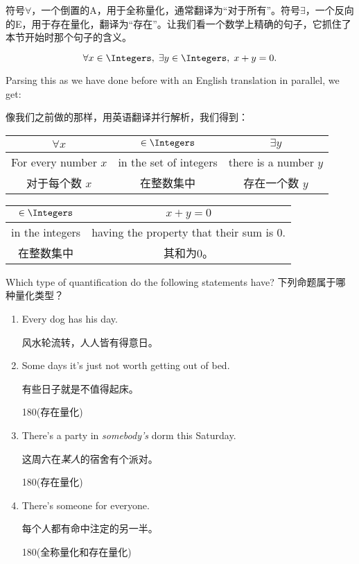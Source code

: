 符号$\forall$，一个倒置的A，用于全称量化，通常翻译为“对于所有”。符号$\exists$，一个反向的E，用于存在量化，翻译为“存在”。让我们看一个数学上精确的句子，它抓住了本节开始时那个句子的含义。

\[ \forall x \in \Integers, \; \exists y \in \Integers, \; x+y=0.
\]

Parsing this as we have done before with an English translation in 
parallel, we get:

像我们之前做的那样，用英语翻译并行解析，我们得到：

\vspace{.2in}

\begin{tabular}{c|c|c}
\rule[-10pt]{0pt}{22pt} $\forall x$ & $\in \Integers$ & $\exists y$  \\ \hline
\rule[-6pt]{0pt}{22pt} For every number $x$ & in the set of integers &
there is a number $y$ \\
\rule[-6pt]{0pt}{22pt} 对于每个数 $x$ & 在整数集中 & 存在一个数 $y$ \\
\end{tabular}

\vspace{.2in}

\begin{tabular}{c|c}
\rule[-10pt]{0pt}{22pt} $\in \Integers$ & $x+y=0$ \\ \hline
\rule[-6pt]{0pt}{22pt} in the integers  & having the property that
their sum is $0$. \\
\rule[-6pt]{0pt}{22pt} 在整数集中 & 其和为0。 \\
\end{tabular}


\vspace{.2in}

\begin{exer} Which type of quantification do the following
statements have?
下列命题属于哪种量化类型？
\begin{enumerate}
\item Every dog has his day.

 风水轮流转，人人皆有得意日。 
\item Some days it's just not worth getting out of bed.

 有些日子就是不值得起床。\begin{turn}{180}(存在量化)\end{turn}
\item There's a party in {\em somebody's} dorm this Saturday.

这周六在{\em 某人}的宿舍有个派对。\begin{turn}{180}(存在量化)\end{turn}
\item There's someone for everyone.

每个人都有命中注定的另一半。\begin{turn}{180}(全称量化和存在量化)\end{turn}
\end{enumerate}
\end{exer}

